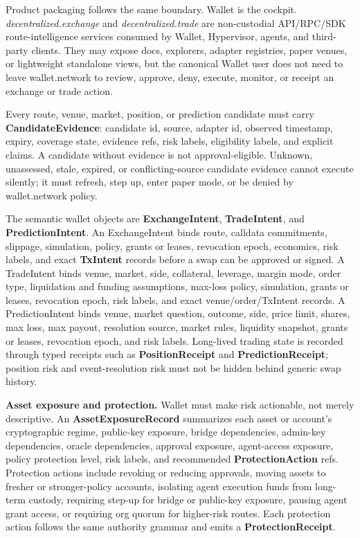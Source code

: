 \documentclass[
  11pt,
]{article}
\begin{document}
Product packaging follows the same boundary. Wallet is the cockpit.
\emph{decentralized.exchange} and \emph{decentralized.trade} are
non-custodial API/RPC/SDK route-intelligence services consumed by
Wallet, Hypervisor, agents, and third-party clients. They may expose
docs, explorers, adapter registries, paper venues, or lightweight
standalone views, but the canonical Wallet user does not need to leave
wallet.network to review, approve, deny, execute, monitor, or receipt an
exchange or trade action.

Every route, venue, market, position, or prediction candidate must carry
\textbf{CandidateEvidence}: candidate id, source, adapter id, observed
timestamp, expiry, coverage state, evidence refs, risk labels,
eligibility labels, and explicit claims. A candidate without evidence is
not approval-eligible. Unknown, unassessed, stale, expired, or
conflicting-source candidate evidence cannot execute silently; it must
refresh, step up, enter paper mode, or be denied by wallet.network
policy.

The semantic wallet objects are \textbf{ExchangeIntent},
\textbf{TradeIntent}, and \textbf{PredictionIntent}. An ExchangeIntent
binds route, calldata commitments, slippage, simulation, policy, grants
or leases, revocation epoch, economics, risk labels, and exact
\textbf{TxIntent} records before a swap can be approved or signed. A
TradeIntent binds venue, market, side, collateral, leverage, margin
mode, order type, liquidation and funding assumptions, max-loss policy,
simulation, grants or leases, revocation epoch, risk labels, and exact
venue/order/TxIntent records. A PredictionIntent binds venue, market
question, outcome, side, price limit, shares, max loss, max payout,
resolution source, market rules, liquidity snapshot, grants or leases,
revocation epoch, and risk labels. Long-lived trading state is recorded
through typed receipts such as \textbf{PositionReceipt} and
\textbf{PredictionReceipt}; position risk and event-resolution risk must
not be hidden behind generic swap history.

\textbf{Asset exposure and protection.} Wallet must make risk
actionable, not merely descriptive. An \textbf{AssetExposureRecord}
summarizes each asset or account's cryptographic regime, public-key
exposure, bridge dependencies, admin-key dependencies, oracle
dependencies, approval exposure, agent-access exposure, policy
protection level, risk labels, and recommended
\textbf{ProtectionAction} refs. Protection actions include revoking or
reducing approvals, moving assets to fresher or stronger-policy
accounts, isolating agent execution funds from long-term custody,
requiring step-up for bridge or public-key exposure, pausing agent grant
access, or requiring org quorum for higher-risk routes. Each protection
action follows the same authority grammar and emits a
\textbf{ProtectionReceipt}.
\end{document}
